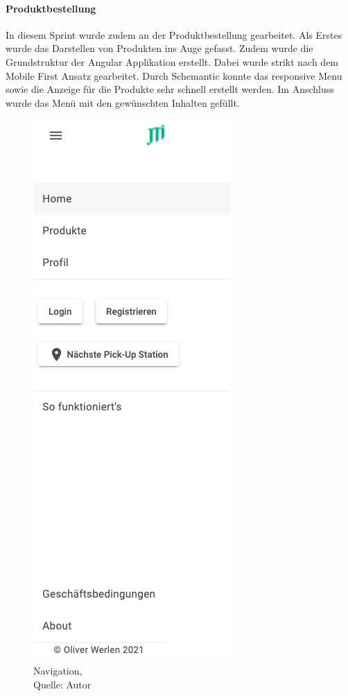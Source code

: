 \paragraph{Produktbestellung}
In diesem Sprint wurde zudem an der Produktbestellung gearbeitet. Als Erstes wurde das Darstellen von Produkten ins Auge gefasst. Zudem wurde die Grundstruktur der Angular Applikation erstellt. 
Dabei wurde strikt nach dem Mobile First Ansatz gearbeitet. Durch Schemantic konnte das responsive Menu sowie die Anzeige für die Produkte sehr schnell erstellt werden. Im Anschluss wurde das Menü mit den gewünschten Inhalten gefüllt. 

\begin{figure}[H]
	\centering
	\includegraphics[scale=0.7]{images/nav.png}
	\caption[Navigation]{Navigation,\\ Quelle: Autor }
	\label{img: navigation}
\end{figure}

